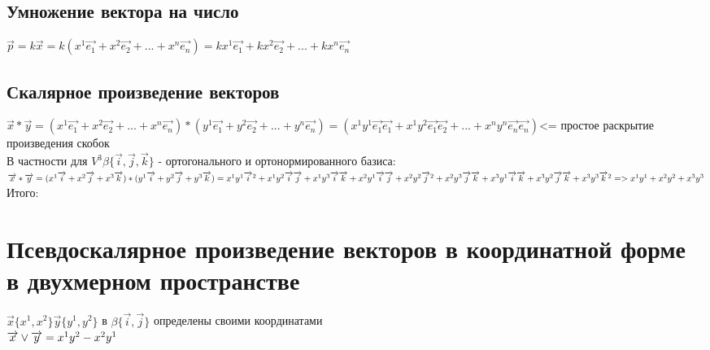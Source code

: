 \documentclass{book}
\begin{document}
\subsection{Умножение вектора на число}
$\overrightarrow{p}=k\overrightarrow{x}=k(x^1\overrightarrow{e_1}+x^2\overrightarrow{e_2}+...+x^n\overrightarrow{e_n})=kx^1\overrightarrow{e_1}+kx^2\overrightarrow{e_2}+...+kx^n\overrightarrow{e_n}$
\subsection{Скалярное произведение векторов}
$\overrightarrow{x}*\overrightarrow{y}=(x^1\overrightarrow{e_1}+x^2\overrightarrow{e_2}+...+x^n\overrightarrow{e_n})*(y^1\overrightarrow{e_1}+y^2\overrightarrow{e_2}+...+y^n\overrightarrow{e_n})=(x^1y^1\overrightarrow{e_1}\overrightarrow{e_1}+x^1y^2\overrightarrow{e_1}\overrightarrow{e_2}+...+x^ny^n\overrightarrow{e_n}\overrightarrow{e_n})$<= простое раскрытие произведения скобок\\
В частности для $V^3 \beta\{\overrightarrow{i},\overrightarrow{j},\overrightarrow{k}\}$ - ортогонального и ортонормированного базиса:\\
$\overrightarrow{x}*\overrightarrow{y}=(x^1\overrightarrow{i}+x^2\overrightarrow{j}+x^3\overrightarrow{k})*(y^1\overrightarrow{i}+y^2\overrightarrow{j}+y^3\overrightarrow{k})=x^1y^1\overrightarrow{i}^2+x^1y^2\overrightarrow{i}\overrightarrow{j}+x^1y^3\overrightarrow{i}\overrightarrow{k}+x^2y^1\overrightarrow{i}\overrightarrow{j}+x^2y^2\overrightarrow{j}^2+x^2y^3\overrightarrow{j}\overrightarrow{k}+x^3y^1\overrightarrow{i}\overrightarrow{k}+x^3y^2\overrightarrow{j}\overrightarrow{k}+x^3y^3\overrightarrow{k}^2 => x^1y^1+x^2y^2+x^3y^3\\$
Итого:
\section{Псевдоскалярное произведение векторов в координатной форме в двухмерном пространстве}
$\overrightarrow{x}\{x^1,x^2\}  \overrightarrow{y}\{y^1,y^2\}$ в $\beta\{\overrightarrow{i},\overrightarrow{j}\}$ определены своими координатами\\
$\overrightarrow{x}\vee\overrightarrow{y}=x^1y^2-x^2y^1\\$
\end{document}
